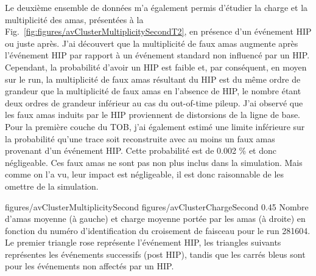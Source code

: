Le deuxième ensemble de données m'a également permis d'étudier la charge et la multiplicité des amas, présentées à la Fig.~\ref{fig:figures/avClusterMultiplicitySecondT2}, en présence d'un événement HIP ou juste après. J'ai découvert que la multiplicité de faux amas augmente après l'événement HIP par rapport à un événement standard non influencé par un HIP. Cependant, la probabilité d'avoir un HIP est faible et, par conséquent, en moyen sur le run, la multiplicité de faux amas résultant du HIP est du même ordre de grandeur que la multiplicité de faux amas en l'absence de HIP, le nombre  étant deux ordres de grandeur inférieur au cas du out-of-time pileup. J'ai observé que les faux amas induits par le HIP proviennent de distorsions de la ligne de base. Pour la première couche du TOB, j'ai également estimé une limite inférieure sur la probabilité qu'une trace soit reconstruite avec au moins un faux amas provenant d'un événement HIP. Cette probabilité est de 0.002 \% et donc négligeable. Ces faux amas ne sont pas non plus inclus dans la simulation. Mais comme on l’a vu, leur impact est négligeable, il est donc raisonnable de les omettre de la simulation.


                 {figures/avClusterMultiplicitySecond} %
                 {figures/avClusterChargeSecond} %
                 {0.45}       %
                 {Nombre d'amas moyenne (à gauche) et charge moyenne portée par les amas (à droite) en fonction du numéro d'identification du croisement de faisceau pour le run 281604. Le premier triangle rose représente l’événement HIP, les triangles suivants représentes les événements successifs (post HIP), tandis que les carrés bleus sont pour les événements non affectés par un HIP. }




